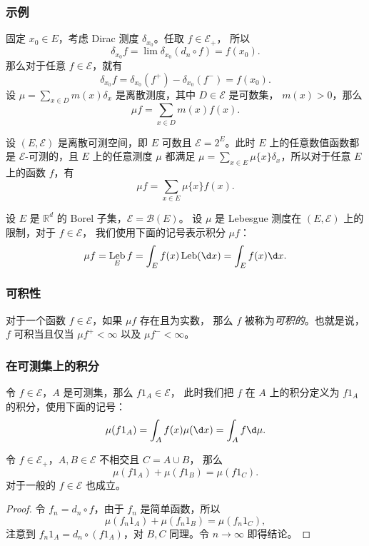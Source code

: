 \documentclass[fontset=none]{Notes}
\DeclareMathOperator\Leb{Leb}
\begin{document}
\subsubsection{示例}

\begin{example}[离散测度]
  固定 $x_0\in E$，考虑 Dirac 测度 $\delta_{x_0}$。任取 $f\in \mathcal{E}_+$，
  所以
  \[
    \delta_{x_0}f=\lim \delta_{x_0}(d_n\circ f)=  f(x_0).
  \]
  那么对于任意 $f\in \mathcal{E}$，就有
  \[
    \delta_{x_0}f=\delta_{x_0}(f^+)-\delta_{x_0}(f^-)=f(x_0).  
  \]
  设 $\mu=\sum_{x\in D} m(x)\delta_x$ 是离散测度，其中 $D\in \mathcal{E}$ 是可数集，
  $m(x)> 0$，那么
  \[
    \mu f=\sum_{x\in D}m(x) f(x).  
  \]
\end{example}

\begin{example}[离散空间]
  设 $(E,\mathcal{E})$ 是离散可测空间，即 $E$ 可数且 $\mathcal{E}=2^E$。此时
  $E$ 上的任意数值函数都是 $\mathcal{E}$-可测的，且 $E$ 上的任意测度 $\mu$ 都满足
  $\mu=\sum_{x\in E}\mu\{x\}\delta_x$，所以对于任意 $E$ 上的函数 $f$，有
  \[
    \mu f=\sum_{x\in E}\mu\{x\} f(x).
  \]
\end{example}

\begin{example}[Lebesgue 积分]
  设 $E$ 是 $\mathbb{R}^d$ 的 Borel 子集，$\mathcal{E}=\mathcal{B}(E)$。
  设 $\mu$ 是 Lebesgue 测度在 $(E,\mathcal{E})$ 上的限制，对于 $f\in \mathcal{E}$，
  我们使用下面的记号表示积分 $\mu f$：
  \[
    \mu f=\Leb_E f=\int_E f(x)\Leb(\d x)=\int_E f(x)\d x.  
  \]
\end{example}

\subsubsection{可积性}

对于一个函数 $f\in \mathcal{E}$，如果 $\mu f$ 存在且为实数，
那么 $f$ 被称为\emph{可积的}。也就是说，$f$ 可积当且仅当 
$\mu f^+<\infty$ 以及 $\mu f^-<\infty$。

\subsubsection{在可测集上的积分}

令 $f\in \mathcal{E}$，$A$ 是可测集，那么 $f1_A\in \mathcal{E}$，
此时我们把 $f$ 在 $A$ 上的积分定义为 $f1_A$ 的积分，使用下面的记号：
\[
  \mu(f1_A)=\int_A f(x)\mu(\d x)=\int_A f \d\mu.  
\]

\begin{lemma}
  令 $f\in \mathcal{E}_+$，$A,B\in \mathcal{E}$ 不相交且 $C=A\cup B$，
  那么
  \[
    \mu(f1_A)+\mu(f1_B)=\mu(f1_C).  
  \]
  对于一般的 $f\in \mathcal{E}$ 也成立。
\end{lemma}
\begin{proof}
  令 $f_n=d_n\circ f$，由于 $f_n$ 是简单函数，所以
  \[
    \mu(f_n1_A)+\mu(f_n1_B)=\mu(f_n1_C),  
  \]
  注意到 $f_n1_A=d_n\circ(f1_A)$，对 $B,C$ 同理。令 $n\to\infty$ 即得结论。
\end{proof}
\end{document}

